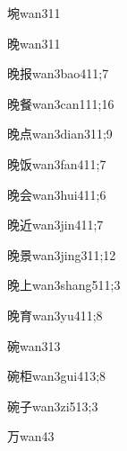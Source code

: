 \begin{verbete}{埦}{wan3}{11}
\end{verbete}
\begin{verbete}{晚}{wan3}{11}
\end{verbete}
\begin{verbete}{晚报}{wan3bao4}{11;7}
\end{verbete}
\begin{verbete}{晚餐}{wan3can1}{11;16}
\end{verbete}
\begin{verbete}{晚点}{wan3dian3}{11;9}
\end{verbete}
\begin{verbete}{晚饭}{wan3fan4}{11;7}
\end{verbete}
\begin{verbete}{晚会}{wan3hui4}{11;6}
\end{verbete}
\begin{verbete}{晚近}{wan3jin4}{11;7}
\end{verbete}
\begin{verbete}{晚景}{wan3jing3}{11;12}
\end{verbete}
\begin{verbete}{晚上}{wan3shang5}{11;3}
\end{verbete}
\begin{verbete}{晚育}{wan3yu4}{11;8}
\end{verbete}
\begin{verbete}{碗}{wan3}{13}
\end{verbete}
\begin{verbete}{碗柜}{wan3gui4}{13;8}
\end{verbete}
\begin{verbete}{碗子}{wan3zi5}{13;3}
\end{verbete}
\begin{verbete}{万}{wan4}{3}
\end{verbete}
